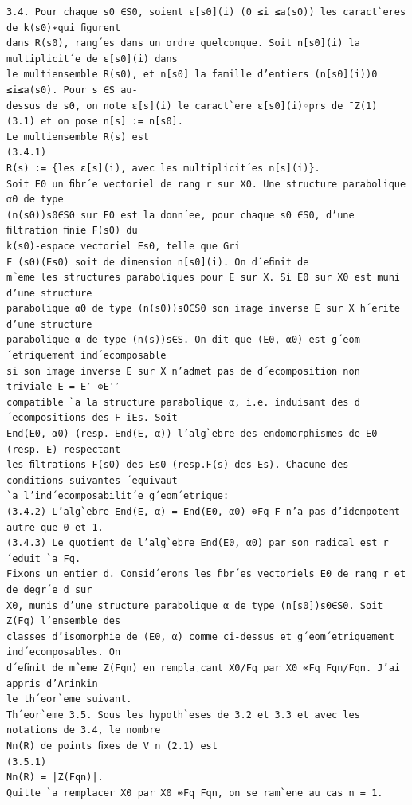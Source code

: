 \documentclass[11pt]{article}
\begin{document}
\begin{Verbatim}[breaklines=true,fontsize=\small]
3.4. Pour chaque s0 ∈S0, soient ε[s0](i) (0 ≤i ≤a(s0)) les caract`eres de k(s0)∗qui ﬁgurent
dans R(s0), rang´es dans un ordre quelconque. Soit n[s0](i) la multiplicit´e de ε[s0](i) dans
le multiensemble R(s0), et n[s0] la famille d’entiers (n[s0](i))0 ≤i≤a(s0). Pour s ∈S au-
dessus de s0, on note ε[s](i) le caract`ere ε[s0](i)◦prs de ¯Z(1) (3.1) et on pose n[s] := n[s0].
Le multiensemble R(s) est
(3.4.1)
R(s) := {les ε[s](i), avec les multiplicit´es n[s](i)}.
Soit E0 un ﬁbr´e vectoriel de rang r sur X0. Une structure parabolique α0 de type
(n(s0))s0∈S0 sur E0 est la donn´ee, pour chaque s0 ∈S0, d’une ﬁltration ﬁnie F(s0) du
k(s0)-espace vectoriel Es0, telle que Gri
F (s0)(Es0) soit de dimension n[s0](i). On d´eﬁnit de
mˆeme les structures paraboliques pour E sur X. Si E0 sur X0 est muni d’une structure
parabolique α0 de type (n(s0))s0∈S0 son image inverse E sur X h´erite d’une structure
parabolique α de type (n(s))s∈S. On dit que (E0, α0) est g´eom´etriquement ind´ecomposable
si son image inverse E sur X n’admet pas de d´ecomposition non triviale E = E′ ⊕E′′
compatible `a la structure parabolique α, i.e. induisant des d´ecompositions des F iEs. Soit
End(E0, α0) (resp. End(E, α)) l’alg`ebre des endomorphismes de E0 (resp. E) respectant
les ﬁltrations F(s0) des Es0 (resp.F(s) des Es). Chacune des conditions suivantes ´equivaut
`a l’ind´ecomposabilit´e g´eom´etrique:
(3.4.2) L’alg`ebre End(E, α) = End(E0, α0) ⊗Fq F n’a pas d’idempotent autre que 0 et 1.
(3.4.3) Le quotient de l’alg`ebre End(E0, α0) par son radical est r´eduit `a Fq.
Fixons un entier d. Consid´erons les ﬁbr´es vectoriels E0 de rang r et de degr´e d sur
X0, munis d’une structure parabolique α de type (n[s0])s0∈S0. Soit Z(Fq) l’ensemble des
classes d’isomorphie de (E0, α) comme ci-dessus et g´eom´etriquement ind´ecomposables. On
d´eﬁnit de mˆeme Z(Fqn) en rempla¸cant X0/Fq par X0 ⊗Fq Fqn/Fqn. J’ai appris d’Arinkin
le th´eor`eme suivant.
Th´eor`eme 3.5. Sous les hypoth`eses de 3.2 et 3.3 et avec les notations de 3.4, le nombre
Nn(R) de points ﬁxes de V n (2.1) est
(3.5.1)
Nn(R) = |Z(Fqn)|.
Quitte `a remplacer X0 par X0 ⊗Fq Fqn, on se ram`ene au cas n = 1.


\end{Verbatim}
\end{document}
